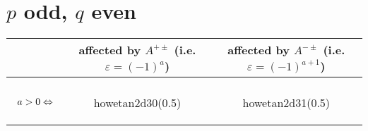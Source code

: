 \documentclass[12pt]{article} %
\theoremstyle{remark}
\renewcommand{\iff}{\Leftrightarrow}
\begin{document}
\section{$p$ odd, $q$ even}
\begin{center}
\begin{tabular}[]{r|c|c}
	&affected by $A^{+\pm}$ (i.e. $\varepsilon=(-1)^a$)&affected by $A^{-\pm}$ (i.e. $\varepsilon=(-1)^{a+1}$)\\
	\hline\\
	$\begin{array}[c]{c}
	a>0\iff\\

\end{array}$&
	{\begin{lpic}{howetan2d30(0.5)}
		
	\end{lpic}}&
	{\begin{lpic}{howetan2d31(0.5)}
		
	\end{lpic}}\\\hline
\end{tabular}
\end{center}
\end{document}
